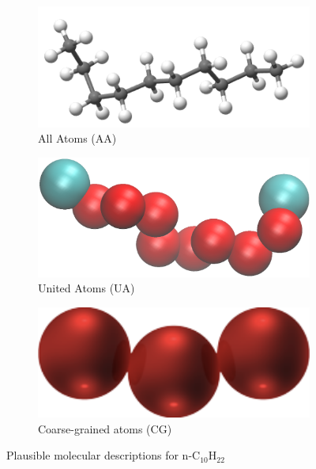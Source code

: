 \documentclass[9pt,tutorial]{livecoms}
\begin{document}
\begin{figure}
	\centering
	\begin{subfigure}{0.27\textwidth} %
    \includegraphics[width=1\textwidth]{gfx/image26.png}
		\caption{All Atoms (AA)} %
	\end{subfigure}
	\begin{subfigure}{0.27\textwidth} %
    \includegraphics[width=1\textwidth]{gfx/image27-tiff.png}
		\caption{United Atoms (UA)} %
	\end{subfigure}
	\begin{subfigure}{0.27\textwidth} %
    \includegraphics[width=1\textwidth]{gfx/image28.png}
		\caption{Coarse-grained atoms (CG)} %
	\end{subfigure}
  \caption{Plausible molecular descriptions for n-C$_{10}$H$_{22}$}
  \label{fig:9b}
\end{figure}
\end{document}
